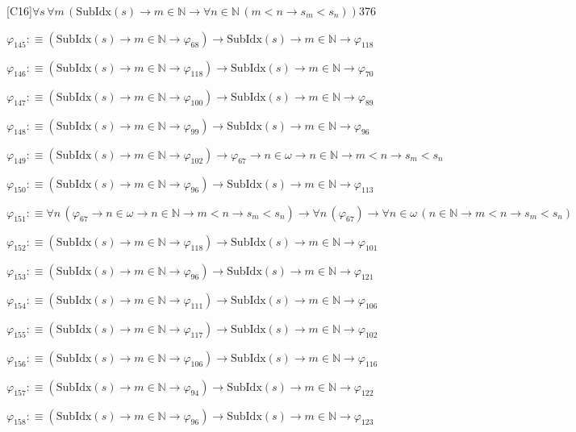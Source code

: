 \begin{fullproof}{[C16]}{$\forall s\,\forall m\,(\mathrm{SubIdx}(s) \to m \in \mathbb{N} \to \forall n \in \mathbb{N}\,(m < n \to s_{m} < s_{n}))$}{376}
\begin{abbrevlist}
\item $\varphi_{145} :\equiv (\mathrm{SubIdx}(s) \to m \in \mathbb{N} \to \varphi_{68}) \to \mathrm{SubIdx}(s) \to m \in \mathbb{N} \to \varphi_{118}$
\item $\varphi_{146} :\equiv (\mathrm{SubIdx}(s) \to m \in \mathbb{N} \to \varphi_{118}) \to \mathrm{SubIdx}(s) \to m \in \mathbb{N} \to \varphi_{70}$
\item $\varphi_{147} :\equiv (\mathrm{SubIdx}(s) \to m \in \mathbb{N} \to \varphi_{100}) \to \mathrm{SubIdx}(s) \to m \in \mathbb{N} \to \varphi_{89}$
\item $\varphi_{148} :\equiv (\mathrm{SubIdx}(s) \to m \in \mathbb{N} \to \varphi_{99}) \to \mathrm{SubIdx}(s) \to m \in \mathbb{N} \to \varphi_{96}$
\item $\varphi_{149} :\equiv (\mathrm{SubIdx}(s) \to m \in \mathbb{N} \to \varphi_{102}) \to \varphi_{67} \to n \in \omega \to n \in \mathbb{N} \to m < n \to s_{m} < s_{n}$
\item $\varphi_{150} :\equiv (\mathrm{SubIdx}(s) \to m \in \mathbb{N} \to \varphi_{96}) \to \mathrm{SubIdx}(s) \to m \in \mathbb{N} \to \varphi_{113}$
\item $\varphi_{151} :\equiv \forall n\,(\varphi_{67} \to n \in \omega \to n \in \mathbb{N} \to m < n \to s_{m} < s_{n}) \to \forall n\,(\varphi_{67}) \to \forall n \in \omega\,(n \in \mathbb{N} \to m < n \to s_{m} < s_{n})$
\item $\varphi_{152} :\equiv (\mathrm{SubIdx}(s) \to m \in \mathbb{N} \to \varphi_{118}) \to \mathrm{SubIdx}(s) \to m \in \mathbb{N} \to \varphi_{101}$
\item $\varphi_{153} :\equiv (\mathrm{SubIdx}(s) \to m \in \mathbb{N} \to \varphi_{96}) \to \mathrm{SubIdx}(s) \to m \in \mathbb{N} \to \varphi_{121}$
\item $\varphi_{154} :\equiv (\mathrm{SubIdx}(s) \to m \in \mathbb{N} \to \varphi_{111}) \to \mathrm{SubIdx}(s) \to m \in \mathbb{N} \to \varphi_{106}$
\item $\varphi_{155} :\equiv (\mathrm{SubIdx}(s) \to m \in \mathbb{N} \to \varphi_{117}) \to \mathrm{SubIdx}(s) \to m \in \mathbb{N} \to \varphi_{102}$
\item $\varphi_{156} :\equiv (\mathrm{SubIdx}(s) \to m \in \mathbb{N} \to \varphi_{106}) \to \mathrm{SubIdx}(s) \to m \in \mathbb{N} \to \varphi_{116}$
\item $\varphi_{157} :\equiv (\mathrm{SubIdx}(s) \to m \in \mathbb{N} \to \varphi_{94}) \to \mathrm{SubIdx}(s) \to m \in \mathbb{N} \to \varphi_{122}$
\item $\varphi_{158} :\equiv (\mathrm{SubIdx}(s) \to m \in \mathbb{N} \to \varphi_{96}) \to \mathrm{SubIdx}(s) \to m \in \mathbb{N} \to \varphi_{123}$

\end{abbrevlist}
\end{fullproof}
